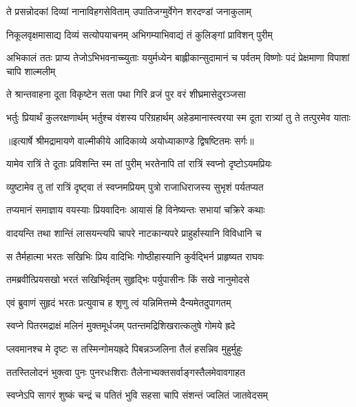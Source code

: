 \twolineshloka
{ते प्रसन्नोदकां दिव्यां नानाविहगसेविताम्}
{उपातिजग्मुर्वेगेन शरदण्डां जनाकुलाम्} %

\twolineshloka
{निकूलवृक्षमासाद्य दिव्यं सत्योपयाचनम्}
{अभिगम्याभिवाद्यं तं कुलिङ्गां प्राविशन् पुरीम्} %

\threelineshloka
{अभिकालं ततः प्राप्य तेजोऽभिभवनाच्च्युताः}
{ययुर्मध्येन बाह्लीकान्सुदामानं च पर्वतम्}
{विष्णोः पदं प्रेक्षमाणा विपाशां चापि शाल्मलीम्} %

\twolineshloka
{ते श्रान्तवाहना दूता विकृष्टेन सता पथा}
{गिरि व्रजं पुर वरं शीघ्रमासेदुरञ्जसा} %

\fourlineindentedshloka
{भर्तुः प्रियार्थं कुलरक्षणार्थम्}
{भर्तुश्च वंशस्य परिग्रहार्थम्}
{अहेडमानास्त्वरया स्म दूता}
{रात्र्यां तु ते तत्पुरमेव याताः} %


{॥इत्यार्षे श्रीमद्रामायणे वाल्मीकीये आदिकाव्ये अयोध्याकाण्डे द्विषष्टितमः सर्गः॥}


\twolineshloka
{यामेव रात्रिं ते दूताः प्रविशन्ति स्म तां पुरीम्}
{भरतेनापि तां रात्रिं स्वप्नो दृष्टोऽयमप्रियः} %

\twolineshloka
{व्युष्टामेव तु तां रात्रिं दृष्ट्वा तं स्वप्नमप्रियम्}
{पुत्रो राजाधिराजस्य सुभृशं पर्यतप्यत} %

\twolineshloka
{तप्यमानं समाज्ञाय वयस्याः प्रियवादिनः}
{आयासं हि विनेष्यन्तः सभायां चक्रिरे कथाः} %

\twolineshloka
{वादयन्ति तथा शान्तिं लासयन्त्यपि चापरे}
{नाटकान्यपरे प्राहुर्हास्यानि विविधानि च} %

\twolineshloka
{स तैर्महात्मा भरतः सखिभिः प्रिय वादिभिः}
{गोष्ठीहास्यानि कुर्वद्भिर्न प्राहृष्यत राघवः} %

\twolineshloka
{तमब्रवीत्प्रियसखो भरतं सखिभिर्वृतम्}
{सुहृद्भिः पर्युपासीनः किं सखे नानुमोदसे} %

\twolineshloka
{एवं ब्रुवाणं सुहृदं भरतः प्रत्युवाच ह}
{शृणु त्वं यन्निमित्तम्मे दैन्यमेतदुपागतम्} %

\twolineshloka
{स्वप्ने पितरमद्राक्षं मलिनं मुक्तमूर्धजम्}
{पतन्तमद्रिशिखरात्कलुषे गोमये ह्रदे} %

\twolineshloka
{प्लवमानश्च मे दृष्टः स तस्मिन्गोमयह्रदे}
{पिबन्नञ्जलिना तैलं हसन्निव मुहुर्मुहुः} %

\twolineshloka
{ततस्तिलोदनं भुक्त्वा पुनः पुनरधःशिराः}
{तैलेनाभ्यक्तसर्वाङ्गस्तैलमेवावगाहत} %

\twolineshloka
{स्वप्नेऽपि सागरं शुष्कं चन्द्रं च पतितं भुवि}
{सहसा चापि संशन्तं ज्वलितं जातवेदसम्} %


